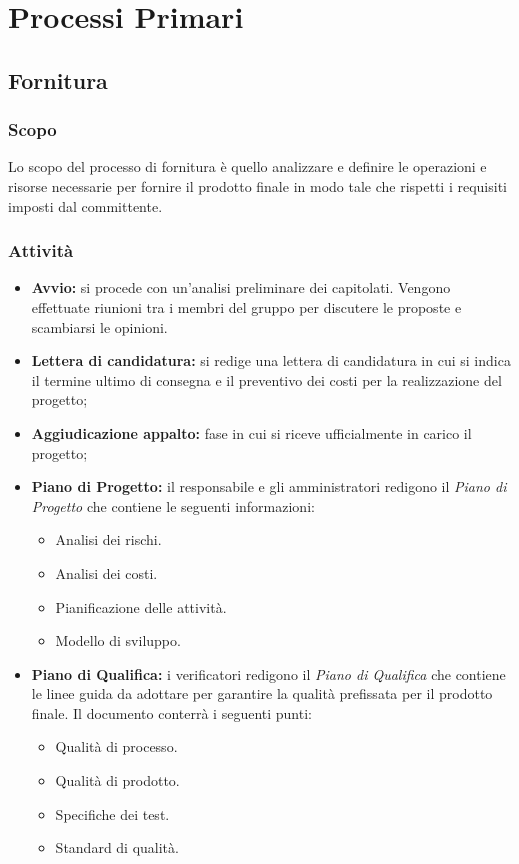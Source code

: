 \section{Processi Primari}
\subsection{Fornitura}
\subsubsection{Scopo}
Lo scopo del processo di fornitura è quello analizzare e definire le operazioni e risorse necessarie per fornire il prodotto finale in modo tale che rispetti i requisiti imposti dal committente.
\subsubsection{Attività}
\begin{itemize}
    \item \textbf{Avvio:} si procede con un'analisi preliminare dei capitolati. Vengono effettuate riunioni tra i membri del gruppo per discutere le proposte e scambiarsi le opinioni.
    \item \textbf{Lettera di candidatura:} si redige una lettera di candidatura in cui si indica il termine ultimo di consegna e il preventivo dei costi per la realizzazione del progetto;
    \item \textbf{Aggiudicazione appalto:} fase in cui si riceve ufficialmente in carico il progetto;
    \item \textbf{Piano di Progetto:} il responsabile e gli amministratori redigono il \textit{Piano di Progetto} che contiene le seguenti informazioni:
        \begin{itemize}
                \item {Analisi dei rischi.}
                \item {Analisi dei costi.}
                \item {Pianificazione delle attività.}
                \item {Modello di sviluppo.}
        \end{itemize}
    \item \textbf{Piano di Qualifica:} i verificatori redigono il \textit{Piano di Qualifica} che contiene le linee guida da adottare per garantire la qualità prefissata per il prodotto finale. Il documento conterrà i seguenti punti:
        \begin{itemize}
                \item {Qualità di processo.}
                \item {Qualità di prodotto.}
                \item {Specifiche dei test.}
                \item {Standard di qualità.}
            \end{itemize}
\end{itemize}
